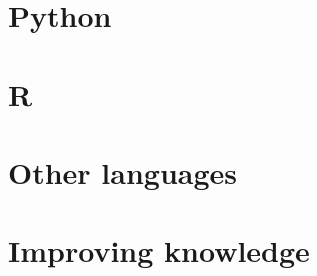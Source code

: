 \documentclass[oneside]{book}
\begin{document}
\part{Python}







\part{R}










\part{Other languages}


\part{Improving knowledge}


\end{document}
